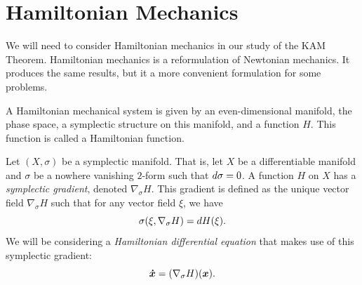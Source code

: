 \documentclass[twoside,letterpaper,10pt]{article}
\newcommand{\sgrad}{\nabla_{\sigma}}
\begin{document}

\section{Hamiltonian Mechanics}
\label{sec:hamilt-mech}

We will need to consider Hamiltonian mechanics in our study of the KAM Theorem.
Hamiltonian mechanics is a reformulation of Newtonian mechanics.
It produces the same results, but it a more convenient formulation for some
problems.

A Hamiltonian mechanical system is given by an even-dimensional manifold, the
phase space, a symplectic structure on this manifold, and a function $H$.
This function is called a Hamiltonian function.

Let $(X, \sigma)$ be a symplectic manifold.
That is, let $X$ be a differentiable manifold and $\sigma$ be a nowhere
vanishing $2$-form such that $\mathop{}\!d \sigma = 0$.
A function $H$ on $X$ has a \emph{symplectic gradient}, denoted $\sgrad H$.
This gradient is defined as the unique vector field $\sgrad H$ such that for any
vector field $\xi$, we have
\begin{equation}
  \label{eq:symplectic-grad}
  \sigma(\xi, \sgrad H) = \dif H(\xi).
\end{equation}
We will be considering a \emph{Hamiltonian differential equation} that makes use
of this symplectic gradient:
\begin{equation}
  \label{eq:hamiltonian-diff-eq}
  \bd{x} = (\sgrad H) (\bp{x}).
\end{equation}
\end{document}
